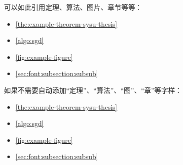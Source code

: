 可以如此引用定理、算法、图片、章节等等：

\begin{itemize}
    \item \autoref{the:example-theorem-sysu-thesis}
    \item \autoref{algo:sgd}
    \item \autoref{fig:example-figure}
    \item \autoref{sec:font:subsection:subsub}
\end{itemize}

如果不需要自动添加“定理”、“算法”、“图”、“章”等字样：

\begin{itemize}
    \item \ref{the:example-theorem-sysu-thesis}
    \item \ref{algo:sgd}
    \item \ref{fig:example-figure}
    \item \ref{sec:font:subsection:subsub}
\end{itemize}

